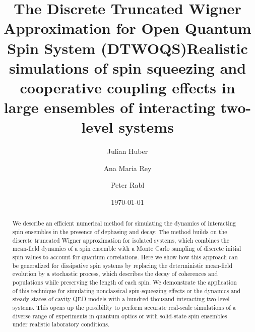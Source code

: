 \documentclass[pra,twocolumn,showpacs,preprintnumbers,amsmath,amssymb,superscriptaddress]{revtex4-1}
\begin{document}
	
	
	\title{The Discrete Truncated Wigner Approximation for Open Quantum Spin System (DTWOQS)}
	
	\title{Realistic simulations of spin squeezing and cooperative coupling effects in large ensembles of interacting two-level systems}   
        
        	\author{Julian Huber}
	\author{Ana Maria Rey}
	\author{Peter Rabl}
	
	
	
	\date{\today}
	
\begin{abstract}

We describe an efficient numerical method for simulating the dynamics of interacting spin ensembles in the presence of dephasing and decay. The method builds on the discrete truncated Wigner approximation for isolated systems, which combines the mean-field dynamics of a spin ensemble with a Monte Carlo sampling of discrete initial spin values to account for quantum correlations. Here we show how this approach can be generalized for dissipative spin systems by replacing the deterministic  mean-field evolution by a stochastic process, which describes the decay of coherences and populations while preserving the length of each spin. We demonstrate the application of this technique for simulating nonclassical spin-squeezing effects or the dynamics and steady states of cavity QED models with a hundred-thousand interacting two-level systems. This opens up the possibility to perform accurate real-scale simulations of a diverse range of experiments in quantum optics or with solid-state spin ensembles under realistic laboratory conditions.
\end{abstract}
	
	
	
\maketitle
\end{document}

